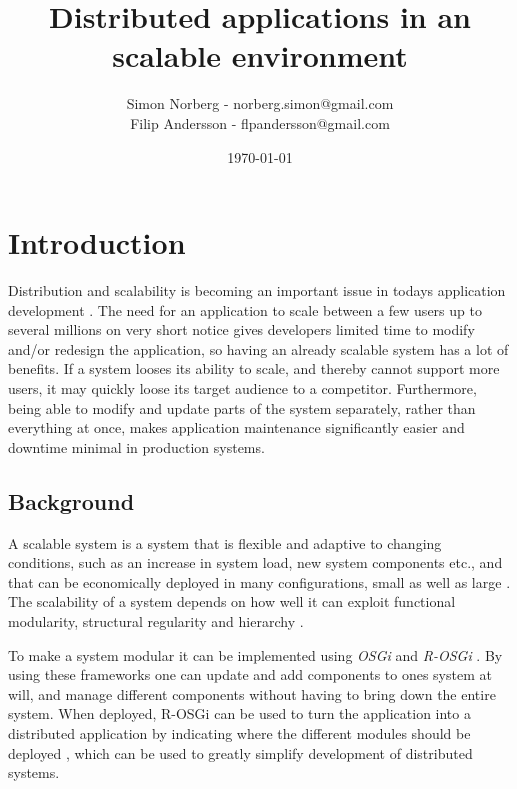 \documentclass{article}
\begin{document}
 
\title{Distributed applications in an scalable environment}
\author{Simon Norberg - norberg.simon@gmail.com\\
        Filip Andersson - flpandersson@gmail.com }
\date{\today}
\maketitle
 
 
\section{Introduction}

Distribution and scalability is becoming an important issue in todays
application development \cite{rellermeyer2007services}.
The need for an application to scale between a few users up to several millions 
on very short notice gives developers limited time to modify and/or redesign 
the application, so having an already scalable system has a lot of benefits. 
If a system looses its ability to scale, and thereby cannot support more users, 
it may quickly loose its target audience to a competitor. Furthermore, being able 
to modify and update parts of the system separately, rather than everything at 
once, makes application maintenance significantly easier and downtime minimal 
in production systems.

\subsection{Background}

A scalable system is a system that is flexible and adaptive to changing
conditions, such as an increase in system load, new system components etc., and
that can be economically deployed in many configurations, small as well as
large \cite{jogalekar2000evaluating}. The scalability of a system depends on
how well it can exploit functional modularity, structural regularity and
hierarchy \cite{lipson2007principles}.

To make a system modular it can be implemented using \emph{OSGi} and
\emph{R-OSGi} \cite{rellermeyer2007services} \cite{marples2001open}. By using these frameworks one can
update and add components to ones system at will, and manage different
components without having to bring down the entire system. When deployed,
R-OSGi can be used to turn the application into a distributed application by
indicating where the different modules should be deployed
\cite{rellermeyer2007r}, which can be used to greatly simplify development of
distributed systems.
\end{document}
